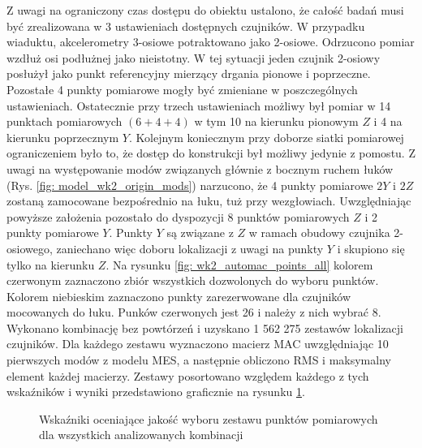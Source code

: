 Z uwagi na ograniczony czas dostępu do obiektu ustalono, że całość badań musi być zrealizowana w 3 ustawieniach dostępnych czujników. W przypadku wiaduktu, akcelerometry 3-osiowe potraktowano jako 2-osiowe. Odrzucono pomiar wzdłuż osi podłużnej jako nieistotny. W tej sytuacji jeden czujnik 2-osiowy posłużył jako punkt referencyjny mierzący drgania pionowe i poprzeczne. Pozostałe 4 punkty pomiarowe mogły być zmieniane w poszczególnych ustawieniach. Ostatecznie przy trzech ustawieniach możliwy był pomiar w 14 punktach pomiarowych $(6+4+4)$ w tym 10 na kierunku pionowym $Z$ i 4 na kierunku poprzecznym $Y$. Kolejnym koniecznym przy doborze siatki pomiarowej ograniczeniem było to, że dostęp do konstrukcji był możliwy jedynie z pomostu. Z uwagi na występowanie modów związanych głównie z bocznym ruchem łuków (Rys. \ref{fig: model_wk2_origin_mods}) narzucono, że 4 punkty pomiarowe $2Y$ i $2Z$ zostaną zamocowane bezpośrednio na łuku, tuż przy wezgłowiach. Uwzględniając powyższe założenia pozostało do dyspozycji 8 punktów pomiarowych $Z$ i 2 punkty pomiarowe $Y$. Punkty $Y$ są związane z $Z$ w ramach obudowy czujnika 2-osiowego, zaniechano więc doboru lokalizacji z uwagi na punkty $Y$ i skupiono się tylko na kierunku $Z$. Na rysunku \ref{fig: wk2_automac_points_all} kolorem czerwonym zaznaczono zbiór wszystkich dozwolonych do wyboru punktów. Kolorem niebieskim zaznaczono punkty zarezerwowane dla czujników mocowanych do łuku. Punków czerwonych jest 26 i należy z nich wybrać 8. Wykonano kombinację bez powtórzeń i uzyskano 1 562 275 zestawów lokalizacji czujników. Dla każdego zestawu wyznaczono macierz MAC uwzględniając 10 pierwszych modów z modelu MES, a następnie obliczono RMS i maksymalny element każdej macierzy. Zestawy posortowano względem każdego z tych wskaźników i wyniki przedstawiono graficznie na rysunku \ref{fig: wk2_automac_charts}. 
\begin{figure}[hbt!]
	\centering
	\captionsetup{justification=centering}
	\captionsetup{justification=centering}
	\caption{Wskaźniki oceniające jakość wyboru zestawu punktów pomiarowych dla wszystkich analizowanych kombinacji}
	\label{fig: wk2_automac_charts}
\end{figure}
